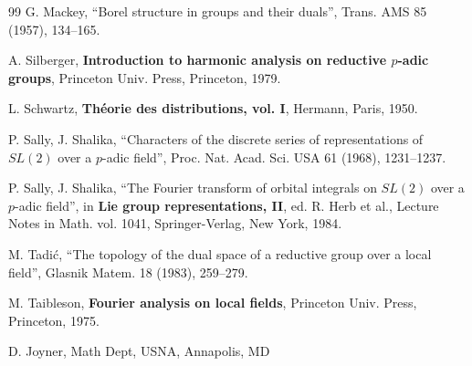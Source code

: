 \documentclass[11pt, a4paper]{article}
\begin{document}
\begin{thebibliography}{99}
  G. Mackey, ``Borel structure in groups and their duals'', Trans. AMS
85 (1957), 134--165.

  A. Silberger, {\bf Introduction to harmonic analysis on reductive
    $p$-adic groups}, Princeton Univ. Press, Princeton, 1979.

  L. Schwartz, {\bf Th\'eorie des distributions, vol. I},
  Hermann, Paris, 1950.

  P. Sally, J. Shalika, ``Characters of the discrete series of
representations of $SL(2)$ over a $p$-adic field'', Proc. Nat. Acad. Sci. USA
61 (1968), 1231--1237.

  P. Sally, J. Shalika, ``The Fourier transform of orbital integrals on $SL(2)$ over a
  $p$-adic field'', in {\bf Lie group representations, II},
  ed. R. Herb et al., Lecture Notes in Math. vol. 1041,
Springer-Verlag, New York, 1984.

  M. Tadi\'c, ``The topology of the dual space of a reductive group over a
local field'', Glasnik Matem. 18 (1983), 259--279.

  M. Taibleson, {\bf Fourier analysis on local fields},
  Princeton Univ. Press, Princeton, 1975.

\end{thebibliography}

\noindent D. Joyner, Math Dept, USNA, Annapolis, MD
\end{document}
